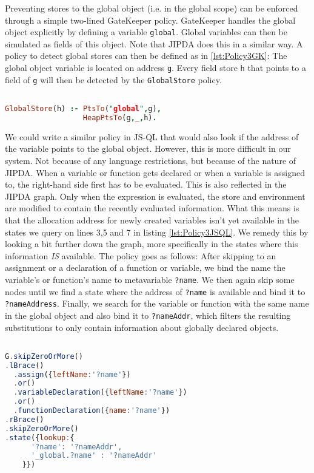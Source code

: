 Preventing stores to the global object (i.e. in the global scope) can be enforced through a simple two-lined GateKeeper policy. GateKeeper handles the global object explicitly by defining a variable \texttt{global}. Global variables can then be simulated as fields of this object. Note that JIPDA does this in a similar way. A policy to detect global stores can then be defined as in \ref{lst:Policy3GK}: The global object variable is located on address \texttt{g}. Every field store \texttt{h} that points to a field of \texttt{g} will then be detected by the \texttt{GlobalStore} policy.

\begin{lstlisting}[label={lst:Policy3GK},language=Prolog,caption=Policy 3 in GateKeeper,mathescape=true]  % float=t?

GlobalStore(h) :- PtsTo("global",g),
                  HeapPtsTo(g,_,h).
\end{lstlisting}

We could write a similar policy in JS-QL that would also look if the address of the variable points to the global object. However, this is more difficult in our system. Not because of any language restrictions, but because of the nature of JIPDA. When a variable or function gets declared or when a variable is assigned to, the right-hand side first has to be evaluated. This is also reflected in the JIPDA graph. Only when the expression is evaluated, the store and environment are modified to contain the recently evaluated information. What this means is that the allocation address for newly created variables isn't yet available in the states we query on lines 3,5 and 7 in listing \ref{lst:Policy3JSQL}. We remedy this by looking a bit further down the graph, more specifically in the states where this information \textit{IS} available. The policy goes as follows: After skipping to an assignment or a declaration of a function or variable, we bind the name the variable's or function's name to metavariable \texttt{?name}. We then again skip some nodes until we find a state where the address of \texttt{?name} is available and bind it to \texttt{?nameAddress}. Finally, we search for the variable or function with the same name in the global object and also bind it to \texttt{?nameAddr}, which filters the resulting substitutions to only contain information about globally declared objects.

\begin{lstlisting}[label={lst:Policy3JSQL},language=JavaScript,caption=Policy 3 in JS-QL,mathescape=true]  % float=t?

G.skipZeroOrMore()
.lBrace()
  .assign({leftName:'?name'})
  .or()
  .variableDeclaration({leftName:'?name'})
  .or()
  .functionDeclaration({name:'?name'})
.rBrace()
.skipZeroOrMore()
.state({lookup:{
      '?name': '?nameAddr',
      '_global.?name' : '?nameAddr'
    }})
\end{lstlisting}

